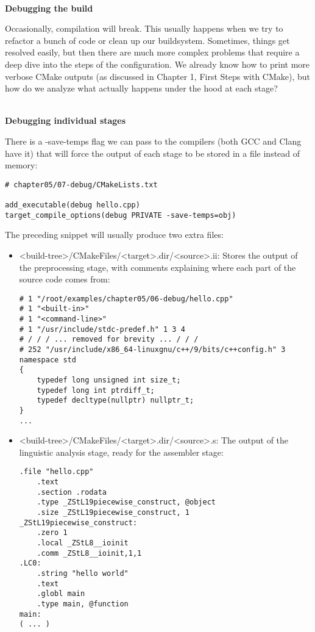 \hspace*{\fill} \\ %
\noindent
\textbf{Debugging the build}

Occasionally, compilation will break. This usually happens when we try to refactor a bunch of code or clean up our buildsystem. Sometimes, things get resolved easily, but then there are much more complex problems that require a deep dive into the steps of the configuration. We already know how to print more verbose CMake outputs (as discussed in Chapter 1, First Steps with CMake), but how do we analyze what actually happens under the hood at each stage?

\hspace*{\fill} \\ %
\noindent
\textbf{Debugging individual stages}

There is a -save-temps flag we can pass to the compilers (both GCC and Clang have it) that will force the output of each stage to be stored in a file instead of memory:

\begin{lstlisting}[style=styleCMake]
# chapter05/07-debug/CMakeLists.txt

add_executable(debug hello.cpp)
target_compile_options(debug PRIVATE -save-temps=obj)
\end{lstlisting}

The preceding snippet will usually produce two extra files:

\begin{itemize}
\item 
<build-tree>/CMakeFiles/<target>.dir/<source>.ii: Stores the output of the preprocessing stage, with comments explaining where each part of the source code comes from:

\begin{lstlisting}[style=styleCXX]
# 1 "/root/examples/chapter05/06-debug/hello.cpp"
# 1 "<built-in>"
# 1 "<command-line>"
# 1 "/usr/include/stdc-predef.h" 1 3 4
# / / / ... removed for brevity ... / / /
# 252 "/usr/include/x86_64-linuxgnu/c++/9/bits/c++config.h" 3
namespace std
{
	typedef long unsigned int size_t;
	typedef long int ptrdiff_t;
	typedef decltype(nullptr) nullptr_t;
}
...
\end{lstlisting}
	
\item 
<build-tree>/CMakeFiles/<target>.dir/<source>.s: The output of the linguistic analysis stage, ready for the assembler stage:

\begin{lstlisting}[style=styleCXX]
	.file "hello.cpp"
	.text
	.section .rodata
	.type _ZStL19piecewise_construct, @object
	.size _ZStL19piecewise_construct, 1
_ZStL19piecewise_construct:
	.zero 1
	.local _ZStL8__ioinit
	.comm _ZStL8__ioinit,1,1
.LC0:
	.string "hello world"
	.text
	.globl main
	.type main, @function
main:
( ... )
\end{lstlisting}

\end{itemize}

